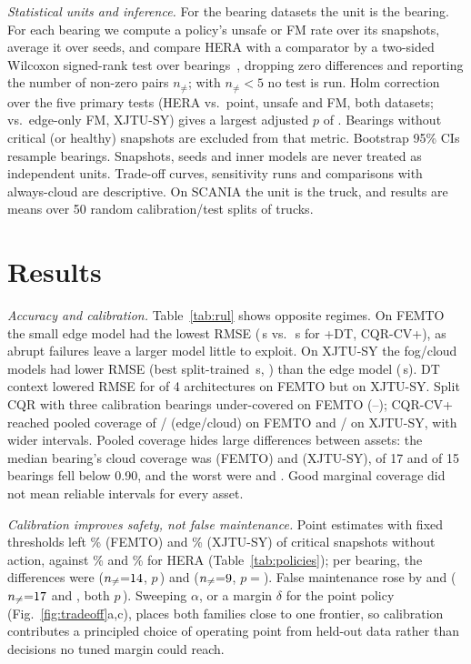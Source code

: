 \documentclass[conference]{IEEEtran}
\begin{document}
\textit{Statistical units and inference.} For the bearing datasets the unit is the bearing. For each bearing we compute a policy's unsafe or FM rate over its snapshots, average it over seeds, and compare HERA with a comparator by a two-sided Wilcoxon signed-rank test over bearings~\cite{demsar2006statistical}, dropping zero differences and reporting the number of non-zero pairs $n_{\neq}$; with $n_{\neq}<5$ no test is run. Holm correction over the five primary tests (HERA vs.\ point, unsafe and FM, both datasets; vs.\ edge-only FM, XJTU-SY) gives a largest adjusted $p$ of \holmMaxP. Bearings without critical (or healthy) snapshots are excluded from that metric. Bootstrap 95\% CIs resample bearings. Snapshots, seeds and inner models are never treated as independent units. Trade-off curves, sensitivity runs and comparisons with always-cloud are descriptive. On SCANIA the unit is the truck, and results are means over 50 random calibration/test splits of trucks.

\section{Results}\label{sec:results}
\textit{Accuracy and calibration.} Table~\ref{tab:rul} shows opposite regimes. On FEMTO the small edge model had the lowest RMSE (\feRmseEdge\,s vs.\ \feRmseCloud\,s for \feCloudModel+DT, CQR-CV+), as abrupt failures leave a larger model little to exploit. On XJTU-SY the fog/cloud models had lower RMSE (best split-trained \xjBestCloudRmse\,s, \xjBestCloudModel) than the edge model (\xjRmseEdgeSplit\,s). DT context lowered RMSE for \feDtHelps{} of 4 architectures on FEMTO but \xjDtHelps{} on XJTU-SY. Split CQR with three calibration bearings under-covered on FEMTO (\feSplitCovMin--\feSplitCovMax); CQR-CV+ reached pooled coverage of \fePicpEdge{}/\fePicpCloud{} (edge/cloud) on FEMTO and \xjPicpEdge{}/\xjPicpCloud{} on XJTU-SY, with wider intervals. Pooled coverage hides large differences between assets: the median bearing's cloud coverage was \fePbCovMed{} (FEMTO) and \xjPbCovMed{} (XJTU-SY), \fePbCovLow{} of 17 and \xjPbCovLow{} of 15 bearings fell below 0.90, and the worst were \fePbCovMin{} and \xjPbCovMin. Good marginal coverage did not mean reliable intervals for every asset.

\textit{Calibration improves safety, not false maintenance.} Point estimates with fixed thresholds left \feUnsafePoint\% (FEMTO) and \xjUnsafePoint\% (XJTU-SY) of critical snapshots without action, against \feUnsafeHera\% and \xjUnsafeHera\% for HERA (Table~\ref{tab:policies}); per bearing, the differences were \feCiUnsafePt{} ($n_{\neq}{=}14$, $p$\,\fePHeraPoint) and \xjCiUnsafePt{} ($n_{\neq}{=}9$, $p{=}$\xjPHeraPoint). False maintenance rose by \feCiFmPt{} and \xjCiFmPt{} ($n_{\neq}{=}17$ and \xjNzFmHeraPoint, both $p$\,\fePFmHeraPoint). Sweeping $\alpha$, or a margin $\delta$ for the point policy (Fig.~\ref{fig:tradeoff}a,c), places both families close to one frontier, so calibration contributes a principled choice of operating point from held-out data rather than decisions no tuned margin could reach.
\end{document}
